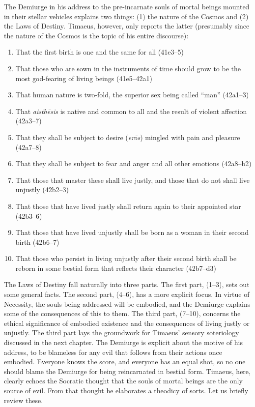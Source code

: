 The Demiurge in his address to the pre-incarnate souls of mortal beings mounted in their stellar vehicles explains two things: (1) the nature of the Cosmos and (2) the Laws of Destiny. Timaeus, however, only reports the latter (presumably since the nature of the Cosmos is the topic of his entire discourse):
\begin{enumerate}[(1)]
	\item That the first birth is one and the same for all (41e3--5)
	\item That those who are sown in the instruments of time should grow to be the most god-fearing of living beings (41e5--42a1)
	\item That human nature is two-fold, the superior sex being called ``man'' (42a1--3)
	\item That \emph{aisthēsis} is native and common to all and the result of violent affection (42a3--7)
	\item That they shall be subject to desire (\emph{erōs}) mingled with pain and pleasure (42a7--8)
	\item That they shall be subject to fear and anger and all other emotions (42a8--b2)
	\item That those that master these shall live justly, and those that do not shall live unjustly (42b2--3)
	\item That those that have lived justly shall return again to their appointed star (42b3--6)
	\item That those that have lived unjustly shall be born as a woman in their second birth (42b6--7)
	\item That those who persist in living unjustly after their second birth shall be reborn in some bestial form that reflects their character (42b7--d3)
\end{enumerate}
The Laws of Destiny fall naturally into three parts. The first part, (1--3), sets out some general facts. The second part, (4--6), has a more explicit focus. In virtue of Necessity, the souls being addressed will be embodied, and the Demiurge explains some of the consequences of this to them. The third part, (7--10), concerns the ethical significance of embodied existence and the consequences of living justly or unjustly. The third part lays the groundwork for Timaeus' sensory soteriology discussed in the next chapter. The Demiurge is explicit about the motive of his address, to be blameless for any evil that follows from their actions once embodied. Everyone knows the score, and everyone has an equal shot, so no one should blame the Demiurge for being reincarnated in bestial form. Timaeus, here, clearly echoes the Socratic thought that the souls of mortal beings are the only source of evil. From that thought he elaborates a theodicy of sorts. Let us briefly review these.

